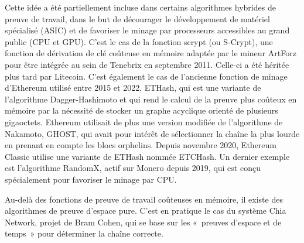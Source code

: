 Cette idée a été partiellement incluse dans certains algorithmes hybrides de preuve de travail, dans le but de décourager le développement de matériel spécialisé (ASIC) et de favoriser le minage par processeurs accessibles au grand public (CPU et GPU). C'est le cas de la fonction scrypt (ou S-Crypt), une fonction de dérivation de clé coûteuse en mémoire adaptée par le mineur ArtForz pour être intégrée au sein de Tenebrix en septembre 2011. Celle-ci a été héritée plus tard par Litecoin. C'est également le cas de l'ancienne fonction de minage d'Ethereum utilisé entre 2015 et 2022, ETHash, qui est une variante de l'algorithme Dagger-Hashimoto et qui rend le calcul de la preuve plus coûteux en mémoire par la nécessité de stocker un graphe acyclique orienté de plusieurs gigaoctets. Ethereum utilisait de plus une version modifiée de l'algorithme de Nakamoto, GHOST, qui avait pour intérêt de sélectionner la chaîne la plus lourde en prenant en compte les blocs orphelins. Depuis novembre 2020, Ethereum Classic utilise une variante de ETHash nommée ETCHash. Un dernier exemple est l'algorithme RandomX, actif sur Monero depuis 2019, qui est conçu spécialement pour favoriser le minage par CPU.

Au-delà des fonctions de preuve de travail coûteuses en mémoire, il existe des algorithmes de preuve d'espace pure. C'est en pratique le cas du système Chia Network, projet de Bram Cohen, qui se base sur les «~preuves d'espace et de temps~» pour déterminer la chaîne correcte.

